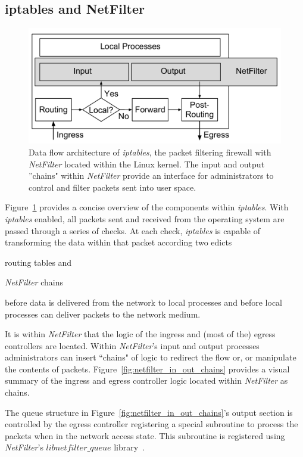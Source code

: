 \documentclass[oneside,12pt]{memoir}
\begin{document}
\subsection{iptables and NetFilter}
\begin{figure}
\centering
\includegraphics[scale=0.55]{netfilter_chain.pdf}
\caption{Data flow architecture of \textit{iptables}, the packet filtering firewall with \textit{NetFilter} located within the Linux kernel. The input and output ''chains" within \textit{NetFilter} provide an interface for administrators to control and filter packets sent into user space.}
\label{fig:netfilter_chain}
\end{figure}

Figure~\ref{fig:netfilter_chain} provides a concise overview of the components within \textit{iptables}. With \textit{iptables} enabled, all packets sent and received from the operating system are passed through a series of checks. At each check, \textit{iptables} is capable of transforming the data within that packet according two edicts
\begin{inparaenum} 
\item routing tables and
\item \textit{NetFilter} chains
\end{inparaenum}
before data is delivered from the network to local processes and before local processes can deliver packets to the network medium.

It is within \textit{NetFilter} that the logic of the ingress and (most of the) egress controllers are located. Within \textit{NetFilter}'s input and output processes administrators can insert ``chains" of logic to redirect the flow or, or manipulate the contents of packets. Figure~\ref{fig:netfilter_in_out_chains} provides a visual summary of the ingress and egress controller logic located within \textit{NetFilter} as chains. 

The queue structure in Figure~\ref{fig:netfilter_in_out_chains}'s output section is controlled by the egress controller registering a special subroutine to process the packets when in the network access state. This subroutine is registered using \textit{NetFilter}'s \textit{$libnetfilter\_queue$} library~\cite{libnetfilterqueue}.
\end{document}
